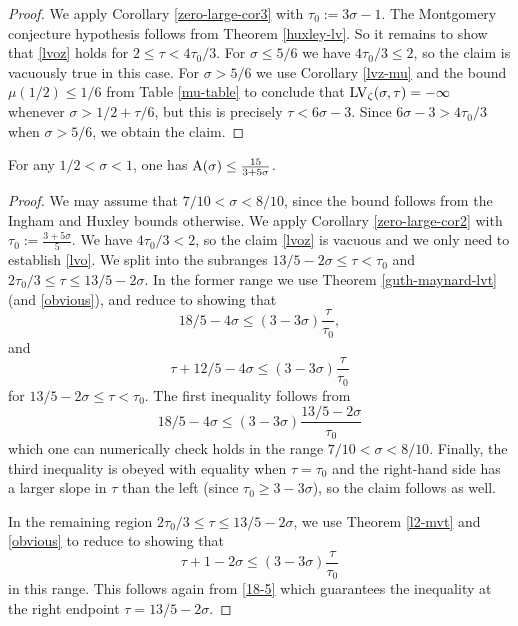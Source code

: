 \begin{proof} We apply Corollary \ref{zero-large-cor3} with $\tau_0 := 3\sigma-1$.  The Montgomery conjecture hypothesis follows from Theorem \ref{huxley-lv}. So it remains to show that \eqref{lvoz} holds for $2 \leq \tau < 4\tau_0/3$.  For $\sigma \leq 5/6$ we have $4\tau_0/3 \leq 2$, so the claim is vacuously true in this case.  For $\sigma > 5/6$ we use Corollary \ref{lvz-mu} and the bound $\mu(1/2) \leq 1/6$ from Table \ref{mu-table} to conclude that
$\mathrm{LV}_\zeta(\sigma,\tau) = -\infty$ whenever $\sigma > 1/2 + \tau/6$, but this is precisely $\tau < 6\sigma - 3$.  Since $6\sigma-3 > 4\tau_0/3$ when $\sigma > 5/6$, we obtain the claim.
\end{proof}

\begin{theorem}\label{guth-maynard-density}  For any $1/2 < \sigma < 1$, one has $\mathrm{A}(\sigma) \leq \frac{15}{3+5\sigma}$.
\end{theorem}
\derived
{}

\begin{proof} We may assume that $7/10 < \sigma < 8/10$, since the bound follows from the Ingham and Huxley bounds otherwise.  We apply Corollary \ref{zero-large-cor2} with $\tau_0 := \frac{3+5\sigma}{5}$.  We have $4\tau_0/3 < 2$, so the claim \eqref{lvoz} is vacuous and we only need to establish \eqref{lvo}.  We split into the subranges $13/5-2\sigma \leq \tau < \tau_0$ and $2\tau_0/3 \leq \tau \leq 13/5-2\sigma$. In the former range we use Theorem \ref{guth-maynard-lvt} (and \eqref{obvious}), and reduce to showing that
$$ 18/5 - 4 \sigma \leq (3-3\sigma) \frac{\tau}{\tau_0},$$
and
$$ \tau + 12/5 - 4\sigma \leq (3-3\sigma) \frac{\tau}{\tau_0}$$
for $13/5-2\sigma \leq \tau < \tau_0$.  The first inequality follows from
\begin{equation}\label{18-5}
 18/5 - 4 \sigma \leq (3-3\sigma) \frac{13/5-2\sigma}{\tau_0}
\end{equation}
which one can numerically check holds in the range $7/10 < \sigma < 8/10$.  Finally, the third inequality is obeyed with equality when $\tau=\tau_0$ and the right-hand side has a larger slope in $\tau$ than the left (since $\tau_0 \geq 3-3\sigma$), so the claim follows as well.

In the remaining region $2\tau_0/3 \leq \tau \leq 13/5-2\sigma$, we use Theorem \ref{l2-mvt} and \eqref{obvious} to reduce to showing that
$$ \tau + 1 - 2\sigma \leq (3-3\sigma) \frac{\tau}{\tau_0}$$
in this range.  This follows again from \eqref{18-5} which guarantees the inequality at the right endpoint $\tau = 13/5-2\sigma$.
\end{proof}

